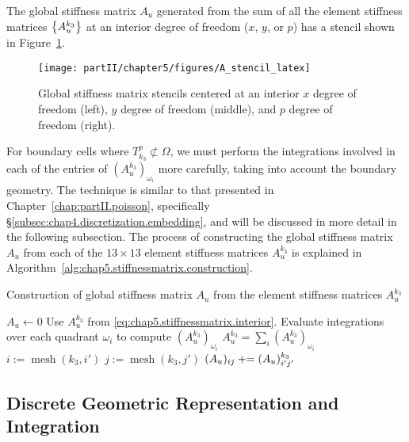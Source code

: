 The global stiffness matrix $A_u$ generated from the sum of all the element stiffness matrices $\left\lbrace A_u^{k_3} \right\rbrace$ at an interior degree of freedom ($x$, $y$, or $p$) has a stencil shown in Figure~\ref{fig:chap5.stiffnessmatrix.global}.

\setlength{\figurewidth}{\textwidth}
\begin{figure}[htbp]
\centering
\texttt{[image: partII/chapter5/figures/A\_stencil\_latex]}
\caption{Global stiffness matrix stencils centered at an interior $x$ degree of freedom (left), $y$ degree of freedom (middle), and $p$ degree of freedom (right).}
\label{fig:chap5.stiffnessmatrix.global}
\end{figure}

For boundary cells where $T^p_{k_3} \not\subset \Omega$, we must perform the integrations involved in each of the entries of $(A_u^{k_3})_{\omega_i}$ more carefully, taking into account the boundary geometry. The technique is similar to that presented in Chapter~\ref{chap:partII.poisson}, specifically \S\ref{subsec:chap4.discretization.embedding}, and will be discussed in more detail in the following subsection. The process of constructing the global stiffness matrix $A_u$ from each of the $13 \times 13$ element stiffness matrices $A_u^{k_3}$ is explained in Algorithm~\ref{alg:chap5.stiffnessmatrix.construction}.

\begin{algorithm}[htbp]
\caption{Construction of global stiffness matrix $A_u$ from the element stiffness matrices $A_u^{k_3}$}
\label{alg:chap5.stiffnessmatrix.construction}
\begin{algorithmic}[1]
\STATE $A_u \leftarrow 0$
        \STATE Use $A_u^{k_3}$ from \eqref{eq:chap5.stiffnessmatrix.interior}.
    \ELSE
        \STATE Evaluate integrations over each quadrant $\omega_i$ to compute $(A_u^{k_3})_{\omega_i}$
        \STATE $A_u^{k_3} = \sum_i (A_u^{k_3})_{\omega_i}$
    \ENDIF
        \STATE $i := \operatorname{mesh}(k_3,i')$ 
            \STATE $j := \operatorname{mesh}(k_3,j')$
            \STATE $(A_u)_{ij} +{}\!\!\!= (A_u)^{k_3}_{i'j'}$
        \ENDFOR
    \ENDFOR
\ENDFOR
\end{algorithmic}
\end{algorithm}

\subsection{Discrete Geometric Representation and Integration} \label{subsec:chap5.discretization.geometry}

